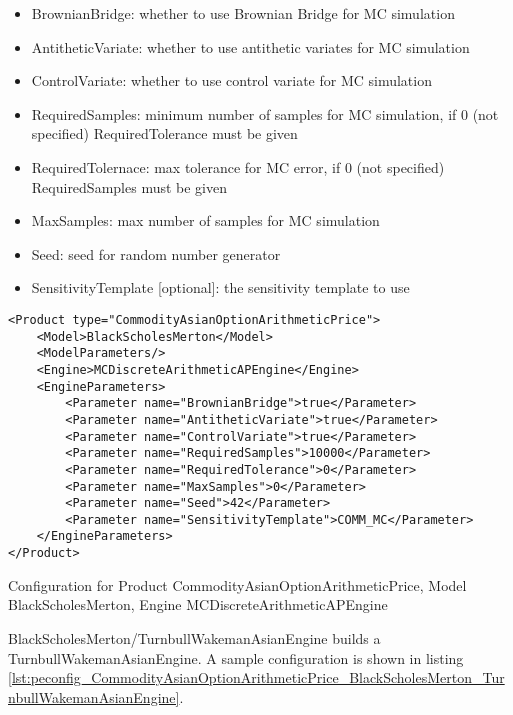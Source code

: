 \begin{itemize}
\item BrownianBridge: whether to use Brownian Bridge for MC simulation
\item AntitheticVariate: whether to use antithetic variates for MC simulation
\item ControlVariate: whether to use control variate for MC simulation
\item RequiredSamples: minimum number of samples for MC simulation, if 0 (not specified) RequiredTolerance must be given
\item RequiredTolernace: max tolerance for MC error, if 0 (not specified) RequiredSamples must be given
\item MaxSamples: max number of samples for MC simulation
\item Seed: seed for random number generator
\item SensitivityTemplate [optional]: the sensitivity template to use 
\end{itemize}

\begin{longlisting}
\begin{verbatim}
<Product type="CommodityAsianOptionArithmeticPrice">
    <Model>BlackScholesMerton</Model>
    <ModelParameters/>
    <Engine>MCDiscreteArithmeticAPEngine</Engine>
    <EngineParameters>
        <Parameter name="BrownianBridge">true</Parameter>    
        <Parameter name="AntitheticVariate">true</Parameter>    
        <Parameter name="ControlVariate">true</Parameter>    
        <Parameter name="RequiredSamples">10000</Parameter>    
        <Parameter name="RequiredTolerance">0</Parameter>    
        <Parameter name="MaxSamples">0</Parameter>    
        <Parameter name="Seed">42</Parameter>    
        <Parameter name="SensitivityTemplate">COMM_MC</Parameter>
    </EngineParameters>
</Product>
\end{verbatim}
\caption{Configuration for Product CommodityAsianOptionArithmeticPrice, Model BlackScholesMerton, Engine MCDiscreteArithmeticAPEngine}
\label{lst:peconfig_CommodityAsianOptionArithmeticPrice_BlackScholesMerton_MCDiscreteArithmeticAPEngine}
\end{longlisting}

BlackScholesMerton/TurnbullWakemanAsianEngine builds a TurnbullWakemanAsianEngine. A sample configuration is shown in
listing \ref{lst:peconfig_CommodityAsianOptionArithmeticPrice_BlackScholesMerton_TurnbullWakemanAsianEngine}.

